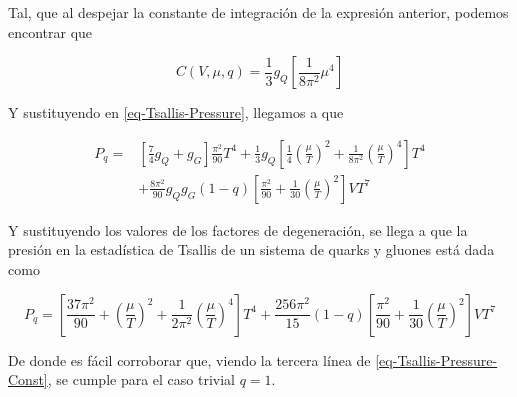 Tal, que al despejar la constante de integración de la expresión anterior, podemos encontrar que

\begin{equation}
C(V,\mu,q) = \frac{1}{3}{g}_{Q} \left[\frac{1}{8{\pi}^{2}} {\mu}^{4} \right]
\end{equation}

Y sustituyendo en \eqref{eq-Tsallis-Pressure}, llegamos a que

\begin{equation}
\begin{split}
{P}_{q} = & \left[\frac{7}{4} {g}_{Q} + {g}_{G} \right] \frac{{\pi}^{2}}{90} {T}^{4} + \frac{1}{3}{g}_{Q} \left[\frac{1}{4} \left(\frac{\mu}{T} \right)^{2} + \frac{1}{8{\pi}^{2}} \left(\frac{\mu}{T} \right)^{4} \right]{T}^{4}\\
& + \frac{8{\pi}^{2}}{90} {g}_{Q}{g}_{G}(1-q) \left[\frac{{\pi}^{2}}{90} + \frac{1}{30} \left( \frac{\mu}{T}\right)^{2}\right]V{T}^{7} 
\end{split}
\end{equation}

Y sustituyendo los valores de los factores de degeneración, se llega a que la presión en la estadística de Tsallis de un sistema de quarks y gluones está dada como

\begin{equation}
{P}_{q} = \left[\frac{37{\pi}^{2}}{90} + \left(\frac{\mu}{T} \right)^{2} + \frac{1}{2{\pi}^{2}} \left(\frac{\mu}{T} \right)^{4} \right]{T}^{4} + \frac{256{\pi}^{2}}{15}(1-q) \left[\frac{{\pi}^{2}}{90} + \frac{1}{30} \left(\frac{\mu}{T} \right)^{2} \right]V{T}^{7}
\end{equation}

De donde es fácil corroborar que, viendo la tercera línea de \eqref{eq-Tsallis-Pressure-Const}, se cumple para el caso trivial ${q}=1$.
